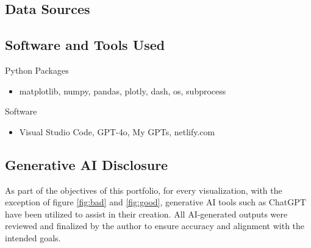 \documentclass[a4paper,landscape]{article}
\begin{document}
\subsection{Data Sources}

\subsection{Software and Tools Used}
Python Packages
\begin{itemize}
    \item matplotlib, numpy, pandas, plotly, dash, os, subprocess
\end{itemize}
Software
\begin{itemize}
    \item Visual Studio Code, GPT-4o, My GPTs, netlify.com
\end{itemize}

\subsection{Generative AI Disclosure}
As part of the objectives of this portfolio, for every visualization, with the exception of figure \ref{fig:bad} and \ref{fig:good}, generative AI tools such as ChatGPT have been utilized to assist in their creation. All AI-generated outputs were reviewed and finalized by the author to ensure accuracy and alignment with the intended goals. 
\end{document}
